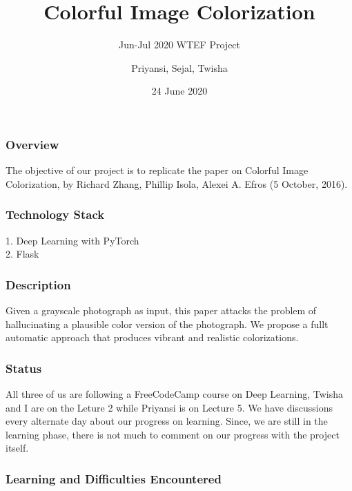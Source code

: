 \documentclass[16pt]{beamer}
\title{Colorful Image Colorization}
\subtitle{Jun-Jul 2020 WTEF Project}
\author[Team 9]{Priyansi, Sejal, Twisha}
\date{24 June 2020}
\begin{document}
\begin{frame}
	\titlepage
\end{frame}

\begin{frame}
	\frametitle{Overview}
	The objective of our project is to replicate the paper on Colorful Image Colorization, by Richard Zhang, Phillip Isola, Alexei A. Efros (5 October, 2016).
\end{frame}

\begin{frame}
	\frametitle{Technology Stack}
	1. Deep Learning with PyTorch \\
	2. Flask
\end{frame}

\begin{frame}
	\frametitle{Description}
	Given a grayscale photograph as input, this paper attacks the problem of hallucinating a plausible color version of the photograph. We propose a fullt automatic approach that produces vibrant and realistic colorizations.
\end{frame}

\begin{frame}
	\frametitle{Status}
	All three of us are following a FreeCodeCamp course on Deep Learning, Twisha and I are on the Leture 2 while Priyansi is on Lecture 5. We have discussions every alternate day about our progress on learning. Since, we are still in the learning phase, there is not much to comment on our progress with the project itself.
\end{frame}

\begin{frame}
	\frametitle{Learning and Difficulties Encountered}
\end{frame}
\end{document}
